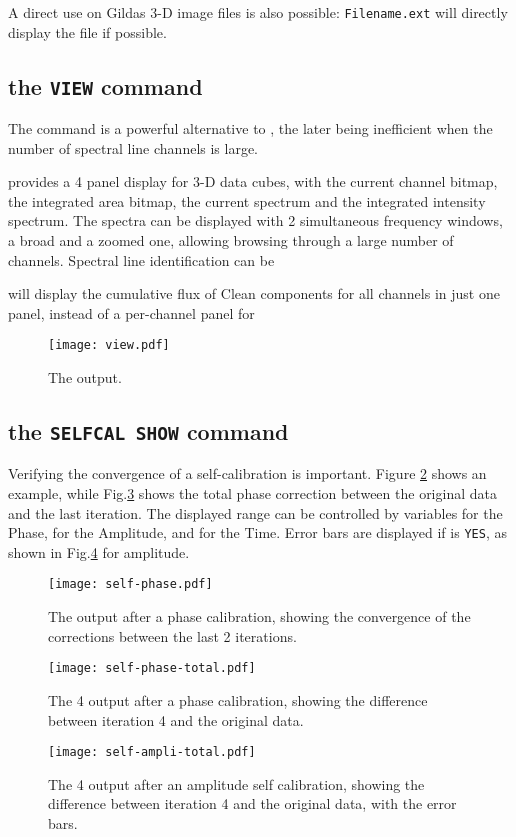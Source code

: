 A direct use on Gildas 3-D image files is also possible:
\texttt{Filename.ext} will directly display the
file if possible.

\subsection{the \texttt{VIEW} command}

The  command is a powerful alternative to , the
later being inefficient when the number of spectral line channels
is large. 

 provides a 4 panel display for 3-D data cubes, with
the current channel bitmap, the integrated area bitmap, the current
spectrum and the integrated intensity spectrum.  The spectra
can be displayed with 2 simultaneous frequency windows, a broad
and a zoomed one, allowing browsing through a large number of
channels. Spectral line identification can be 

 will display the cumulative flux of Clean components
for all channels in just one panel, instead of a per-channel panel
for 

\begin{figure}
  \centering
  \texttt{[image: view.pdf]}
  \caption{The  output.
\label{fig:view}}
\end{figure}

\subsection{the \texttt{SELFCAL SHOW} command}

Verifying the convergence of a self-calibration is important.
Figure \ref{fig:selfphase} shows an example, while Fig.\ref{fig:selftot}
shows the total phase correction between the original data and
the last iteration. The displayed range can be controlled
by variables  for the Phase, 
 for the Amplitude, and  
for the Time. Error bars are displayed if  is \texttt{YES},
as shown in Fig.\ref{fig:selfamp} for amplitude.

\begin{figure}
  \centering
  \texttt{[image: self-phase.pdf]}
  \caption{The  output after a phase calibration,
  showing the convergence of the corrections between the last 2
  iterations.
\label{fig:selfphase}}
\end{figure}
\begin{figure}
  \centering
  \texttt{[image: self-phase-total.pdf]}
  \caption{The 4 output after a phase calibration,
  showing the difference between iteration 4 and the original
  data.  
\label{fig:selftot}}
\end{figure}
\begin{figure}
  \centering
  \texttt{[image: self-ampli-total.pdf]}
  \caption{The 4 output after an amplitude self calibration,
  showing the difference between iteration 4 and the original
  data, with the error bars.  
\label{fig:selfamp}}
\end{figure}
